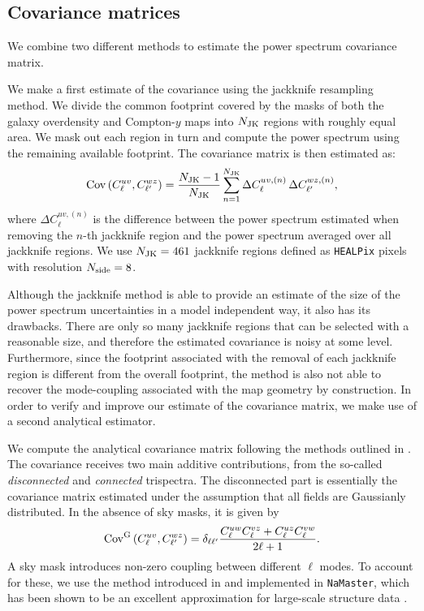 \documentclass[useAMS,usenatbib]{mn2e}
\begin{document}
  \subsection{Covariance matrices}\label{ssec:methods.cov}
    We combine two different methods to estimate the power spectrum covariance matrix. 
    
    We make a first estimate of the covariance using the jackknife resampling method. We divide the common footprint covered by the masks of both the galaxy overdensity and Compton-$y$ maps into $N_{\rm JK}$ regions with roughly equal area. We mask out each region in turn and compute the power spectrum  using the remaining available footprint. The covariance matrix is then estimated as:
    \begin{equation}\label{eq:cov_jk}
      {\rm Cov}\left(C^{uv}_\ell,C^{wz}_{\ell'}\right)=\frac{N_{\rm JK}-1}{N_{\rm JK}}\sum_{n=1}^{N_{\rm JK}}\Delta C^{uv,(n)}_\ell\,\Delta C^{wz,(n)}_{\ell'},
    \end{equation}
    where $\Delta C^{uv,(n)}_\ell$ is the difference between the power spectrum estimated when removing the $n$-th jackknife region and the power spectrum averaged over all jackknife regions. We use $N_{\rm JK}=461$ jackknife regions defined as {\tt HEALPix} pixels with resolution $N_{\rm side}=8$.

    Although the jackknife method is able to provide an estimate of the size of the power spectrum uncertainties in a model independent way, it also has its drawbacks. There are only so many jackknife regions that can be selected with a reasonable size, and therefore the estimated covariance is noisy at some level. Furthermore, since the footprint associated with the removal of each jackknife region is different from the overall footprint, the method is also not able to recover the mode-coupling associated with the map geometry by construction. In order to verify and improve our estimate of the covariance matrix, we make use of a second analytical estimator.

    We compute the analytical covariance matrix following the methods outlined in \cite{2017MNRAS.470.2100K}. The covariance receives two main additive contributions, from the so-called {\sl disconnected} and {\sl connected} trispectra. The disconnected part is essentially the covariance matrix estimated under the assumption that all fields are Gaussianly distributed. In the absence of sky masks, it is given by
    \begin{equation}
      {\rm Cov}^{\rm G}\left(C^{uv}_\ell,C^{wz}_{\ell'}\right)=\delta_{\ell\ell'}\frac{C^{uw}_\ell C^{vz}_\ell+C^{uz}_\ell C^{vw}_\ell}{2\ell+1}.
    \end{equation}
    A sky mask introduces non-zero coupling between different $\ell$ modes. To account for these, we use the  method introduced in \cite{2004MNRAS.349..603E} and implemented in {\tt NaMaster}, which has been shown to be an excellent approximation for large-scale structure data \citep{2019arXiv190611765G}.
\end{document}
